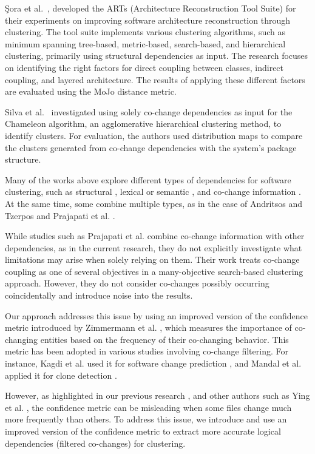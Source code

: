 \documentclass{ieeeaccess}
\begin{document}
Şora et al.~\cite{b12}, \cite{b19} developed the ARTs (Architecture Reconstruction Tool Suite) for their experiments on improving software architecture reconstruction through clustering. The tool suite implements various clustering algorithms, such as minimum spanning tree-based, metric-based, search-based, and hierarchical clustering, primarily using structural dependencies as input. The research focuses on identifying the right factors for direct coupling between classes, indirect coupling, and layered architecture. The results of applying these different factors are evaluated using the MoJo distance metric.

Silva et al.~\cite{b16} investigated using solely co-change dependencies as input for the Chameleon algorithm, an agglomerative hierarchical clustering method, to identify clusters. For evaluation, the authors used distribution maps to compare the clusters generated from co-change dependencies with the system's package structure.

Many of the works above explore different types of dependencies for software clustering, such as structural \cite{b10, wu, b12, b19, tzerpos1, maletic, b18}, lexical or semantic \cite{b18, corazza2, b13, b14}, and co-change information \cite{b16}. At the same time, some combine multiple types, as in the case of Andritsos and Tzerpos \cite{tzerpos1} and Prajapati et al. \cite{b18}.

While studies such as Prajapati et al. \cite{b18} combine co-change information with other dependencies, as in the current research, they do not explicitly investigate what limitations may arise when solely relying on them. Their work treats co-change coupling as one of several objectives in a many-objective search-based clustering approach. However, they do not consider co-changes possibly occurring coincidentally and introduce noise into the results.

Our approach addresses this issue by using an improved version of the confidence metric introduced by Zimmermann et al. \cite{Zimmermann:2004:MVH:998675.999460}, which measures the importance of co-changing entities based on the frequency of their co-changing behavior. This metric has been adopted in various studies involving co-change filtering. For instance, Kagdi et al. used it for software change prediction \cite{article-Kagdi-commit}, and Mandal et al. applied it for clone detection \cite{Mandal-clones}.

However, as highlighted in our previous research \cite{b4}, and other authors such as Ying et al. \cite{Ying-co-change}, the confidence metric can be misleading when some files change much more frequently than others. To address this issue, we  introduce and use an improved version of the confidence metric to extract more accurate logical dependencies (filtered co-changes) for clustering. 
\end{document}
